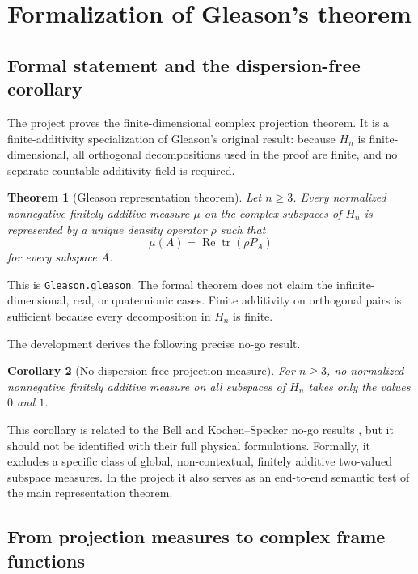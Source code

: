 \documentclass[pdflatex,sn-mathphys-num]{sn-jnl}
\providecommand{\passthrough}[1]{#1}
\theoremstyle{thmstyleone}
\newtheorem{theorem}{Theorem}
\newtheorem{corollary}[theorem]{Corollary}
\theoremstyle{thmstylethree}
\begin{document}
\section{Formalization of Gleason's theorem}\label{sec:gleason}

\subsection{Formal statement and the dispersion-free corollary}\label{formal-statement-and-the-dispersion-free-corollary}

The project proves the finite-dimensional complex projection theorem. It is a finite-additivity specialization of Gleason's original result: because \(H_n\) is finite-dimensional, all orthogonal decompositions used in the proof are finite, and no separate countable-additivity field is required.

\begin{theorem}[Gleason representation theorem]\label{thm:gleason}
Let \(n\geq 3\). Every normalized nonnegative finitely additive measure \(\mu\) on the complex subspaces of \(H_n\) is represented by a unique density operator \(\rho\) such that
\[
\mu(A)=\operatorname{Re}\operatorname{tr}(\rho P_A)
\]
for every subspace \(A\).
\end{theorem}

This is \passthrough{\lstinline!Gleason.gleason!}. The formal theorem does not claim the infinite-dimensional, real, or quaternionic cases. Finite additivity on orthogonal pairs is sufficient because every decomposition in \(H_n\) is finite.

The development derives the following precise no-go result.

\begin{corollary}[No dispersion-free projection measure]\label{cor:no-dispersion}
For \(n\geq 3\), no normalized nonnegative finitely additive measure on all subspaces of \(H_n\) takes only the values \(0\) and \(1\).
\end{corollary}

This corollary is related to the Bell and Kochen--Specker no-go results \cite{bell1966,kochen1967}, but it should not be identified with their full physical formulations. Formally, it excludes a specific class of global, non-contextual, finitely additive two-valued subspace measures. In the project it also serves as an end-to-end semantic test of the main representation theorem.

\subsection{From projection measures to complex frame functions}\label{from-projection-measures-to-complex-frame-functions}
\end{document}
